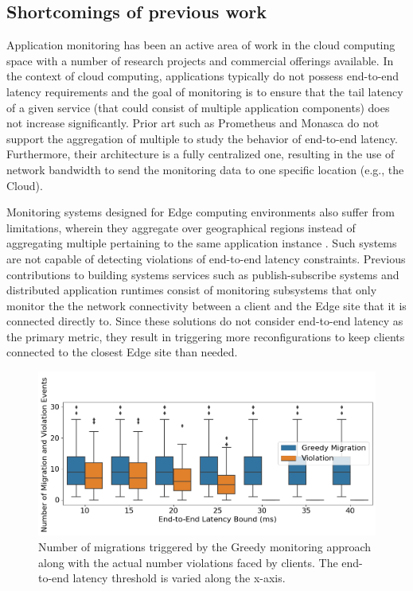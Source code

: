 \subsection{Shortcomings of previous work}
\label{sec:monitor_prev_work}
\par Application monitoring has been an active area of work in the cloud computing space with a number of research projects and commercial offerings available. In the context of cloud computing, applications typically do not possess end-to-end latency requirements and the goal of monitoring is to ensure that the tail latency of a given service (that could consist of multiple application components) does not increase significantly. Prior art such as Prometheus \cite{prometheus} and Monasca \cite{monasca} do not support the aggregation of multiple  to study the behavior of end-to-end latency. Furthermore, their architecture is a fully centralized one, resulting in the use of network bandwidth to send the monitoring data to one specific location (e.g., the Cloud).
\par Monitoring systems designed for Edge computing environments also suffer from limitations, wherein they aggregate  over geographical regions instead of aggregating multiple  pertaining to the same application instance \cite{fmone, gonccalves2021dynamic}. Such systems are not capable of detecting violations of end-to-end latency constraints. Previous contributions to building systems services such as publish-subscribe systems \cite{emma} and distributed application runtimes \cite{foglets} consist of monitoring subsystems that only monitor the the network connectivity between a client and the Edge site that it is connected directly to. Since these solutions do not consider end-to-end latency as the primary metric, they result in triggering more reconfigurations to keep clients connected to the closest Edge site than needed.
\begin{figure}
\centering
\includegraphics[width=0.75\linewidth]{figures/mechanisms/monitoring/migrations_count_greedy.png}
\caption{Number of migrations triggered by the Greedy monitoring approach along with the actual number violations faced by clients. The end-to-end latency threshold is varied along the x-axis.}
\label{fig:migration_count}
\end{figure}
